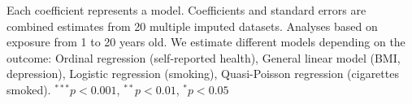 \begin{table}[htp]
\begin{center}
\begin{threeparttable}
\begin{tabular}{l D{.}{.}{4.3} D{.}{.}{4.3} D{.}{.}{4.3} D{.}{.}{4.3} D{.}{.}{4.4} }
\end{tabular}
\begin{tablenotes}
\scriptsize
\item Each coefficient represents a model. Coefficients and standard errors are combined estimates from 20 multiple imputed datasets. Analyses based on exposure from 1 to 20 years old. We estimate different models depending on the outcome: Ordinal regression (self-reported health), General linear model (BMI, depression), Logistic regression (smoking), Quasi-Poisson regression (cigarettes smoked). $^{***}p<0.001$, $^{**}p<0.01$, $^*p<0.05$
\end{tablenotes}
\label{tab:psid_z_models}
\end{threeparttable}
\end{center}
\end{table}
